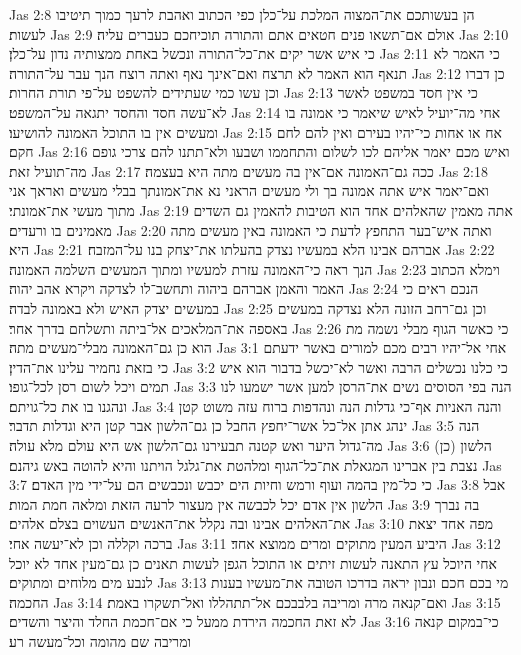 Jas 2:8  הן בעשותכם את־המצוה המלכת על־כלן כפי הכתוב ואהבת לרעך כמוך תיטיבו לעשות׃
Jas 2:9  אולם אם־תשאו פנים חטאים אתם והתורה תוכיחכם כעברים עליה׃
Jas 2:10  כי איש אשר יקים את־כל־התורה ונכשל באחת ממצותיה נדון על־כלן׃
Jas 2:11  כי האמר לא תנאף הוא האמר לא תרצח ואם־אינך נאף ואתה רוצח הנך עבר על־התורה׃
Jas 2:12  כן דברו וכן עשו כמי שעתידים להשפט על־פי תורת החרות׃
Jas 2:13  כי אין חסד במשפט לאשר לא־עשה חסד והחסד יתגאה על־המשפט׃
Jas 2:14  אחי מה־יועיל לאיש שיאמר כי אמונה בו ומעשים אין בו התוכל האמונה להושיעו׃
Jas 2:15  אח או אחות כי־יהיו בעירם ואין להם לחם חקם׃
Jas 2:16  ואיש מכם יאמר אליהם לכו לשלום והתחממו ושבעו ולא־תתנו להם צרכי גופם מה־תועיל זאת׃
Jas 2:17  ככה גם־האמונה אם־אין בה מעשים מתה היא בעצמה׃
Jas 2:18  ואם־יאמר איש אתה אמונה בך ולי מעשים הראני נא את־אמונתך בבלי מעשים ואראך אני מתוך מעשי את־אמונתי׃
Jas 2:19  אתה מאמין שהאלהים אחד הוא הטיבות להאמין גם השדים מאמינים בו ורעדים׃
Jas 2:20  ואתה איש־בער התחפץ לדעת כי האמונה באין מעשים מתה היא׃
Jas 2:21  אברהם אבינו הלא במעשיו נצדק בהעלתו את־יצחק בנו על־המזבח׃
Jas 2:22  הנך ראה כי־האמונה עזרת למעשיו ומתוך המעשים השלמה האמונה׃
Jas 2:23  וימלא הכתוב האמר והאמן אברהם ביהוה ותחשב־לו לצדקה ויקרא אהב יהוה׃
Jas 2:24  הנכם ראים כי במעשים יצדק האיש ולא באמונה לבדה׃
Jas 2:25  וכן גם־רחב הזונה הלא נצדקה במעשים באספה את־המלאכים אל־ביתה ותשלחם בדרך אחר׃
Jas 2:26  כי כאשר הגוף מבלי נשמה מת הוא כן גם־האמונה מבלי־מעשים מתה׃
Jas 3:1  אחי אל־יהיו רבים מכם למורים באשר ידעתם כי בזאת נחמיר עלינו את־הדין׃
Jas 3:2  כי כלנו נכשלים הרבה ואשר לא־יכשל בדבור הוא איש תמים ויכל לשום רסן לכל־גופו׃
Jas 3:3  הנה בפי הסוסים נשים את־הרסן למען אשר ישמעו לנו ונהגנו בו את כל־גויתם׃
Jas 3:4  והנה האניות אף־כי גדלות הנה ונהדפות ברוח עזה משוט קטן ינהג אתן אל־כל אשר־יחפץ החבל כן גם־הלשון אבר קטן היא וגדלות תדבר׃
Jas 3:5  הנה מה־גדול היער ואש קטנה תבעירנו גם־הלשון אש היא עולם מלא עולה׃
Jas 3:6  (כן) הלשון נצבת בין אברינו המגאלת את־כל־הגוף ומלהטת את־גלגל הויתנו והיא להוטה באש גיהנם׃
Jas 3:7  כי כל־מין בהמה ועוף ורמש וחיות הים יכבש ונכבשים הם על־ידי מין האדם׃
Jas 3:8  אבל הלשון אין אדם יכל לכבשה אין מעצור לרעה הזאת ומלאה חמת המות׃
Jas 3:9  בה נברך את־האלהים אבינו ובה נקלל את־האנשים העשוים בצלם אלהים׃
Jas 3:10  מפה אחד יצאת ברכה וקללה וכן לא־יעשה אחי׃
Jas 3:11  היביע המעין מתוקים ומרים ממוצא אחד׃
Jas 3:12  אחי היוכל עץ התאנה לעשות זיתים או התוכל הגפן לעשות תאנים כן גם־מעין אחד לא יוכל לנבע מים מלוחים ומתוקים׃
Jas 3:13  מי בכם חכם ונבון יראה בדרכו הטובה את־מעשיו בענות החכמה׃
Jas 3:14  ואם־קנאה מרה ומריבה בלבבכם אל־תתהללו ואל־תשקרו באמת׃
Jas 3:15  לא זאת החכמה הירדת ממעל כי אם־חכמת החלד והיצר והשדים׃
Jas 3:16  כי־במקום קנאה ומריבה שם מהומה וכל־מעשה רע׃
